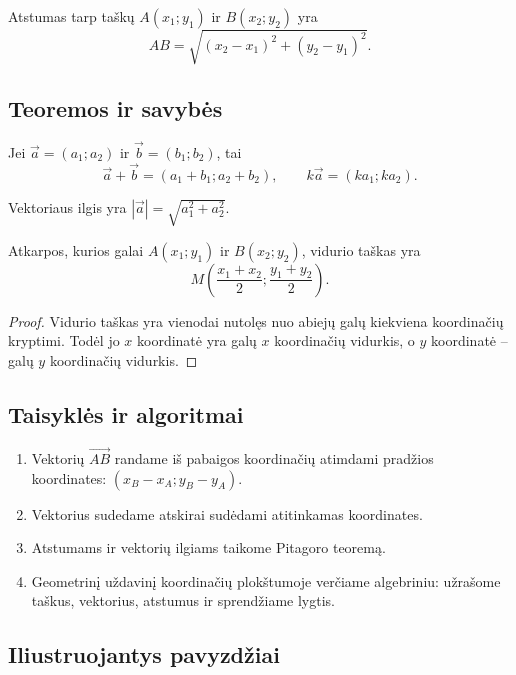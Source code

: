 \begin{apibreztis}
Atstumas tarp taškų $A(x_1;y_1)$ ir $B(x_2;y_2)$ yra
\[
AB=\sqrt{(x_2-x_1)^2+(y_2-y_1)^2}.
\]
\end{apibreztis}

\subsection{Teoremos ir savybės}

\begin{savybe}
Jei $\vec a=(a_1;a_2)$ ir $\vec b=(b_1;b_2)$, tai
\[
\vec a+\vec b=(a_1+b_1;a_2+b_2),\qquad k\vec a=(ka_1;ka_2).
\]
\end{savybe}

\begin{savybe}
Vektoriaus ilgis yra $|\vec a|=\sqrt{a_1^2+a_2^2}$.
\end{savybe}

\begin{teorema}
Atkarpos, kurios galai $A(x_1;y_1)$ ir $B(x_2;y_2)$, vidurio taškas yra
\[
M\left(\frac{x_1+x_2}{2};\frac{y_1+y_2}{2}\right).
\]
\end{teorema}
\begin{proof}
Vidurio taškas yra vienodai nutolęs nuo abiejų galų kiekviena koordinačių kryptimi. Todėl jo $x$ koordinatė yra galų $x$ koordinačių vidurkis, o $y$ koordinatė -- galų $y$ koordinačių vidurkis.
\end{proof}

\subsection{Taisyklės ir algoritmai}

\begin{enumerate}
\item Vektorių $\overrightarrow{AB}$ randame iš pabaigos koordinačių atimdami pradžios koordinates: $(x_B-x_A;y_B-y_A)$.
\item Vektorius sudedame atskirai sudėdami atitinkamas koordinates.
\item Atstumams ir vektorių ilgiams taikome Pitagoro teoremą.
\item Geometrinį uždavinį koordinačių plokštumoje verčiame algebriniu: užrašome taškus, vektorius, atstumus ir sprendžiame lygtis.
\end{enumerate}

\subsection{Iliustruojantys pavyzdžiai}

